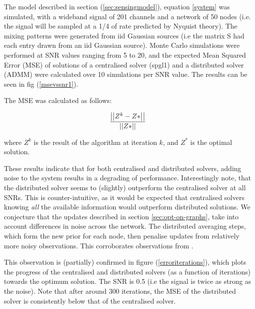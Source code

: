\documentclass[conference]{IEEEtran}
\begin{document}
The model described in section (\ref{sec:sensingmodel}), equation \eqref{system} was simulated, with a wideband signal of 201 channels and a network of 50 nodes (i.e. the signal will be sampled at a 1/4 of rate predicted by Nyquist theory). The mixing patterns were generated from iid Gaussian sources (i.e the matrix S had each entry drawn from an iid Gaussian source). Monte Carlo simulations were performed at SNR values ranging from 5 to 20, and the expected Mean Squared Error (MSE) of solutions of a centralised solver (spgl1) and a distributed solver (ADMM) were calculated over 10 simulations per SNR value. The results can be seen in fig (\ref{msevssnr1}). 

The MSE was calculated as follows:

\begin{equation}
\frac{\left|\left|Z^k - Z*\right|\right|}{\left|\left|Z*\right|\right|}
\end{equation}

where \(Z^k\) is the result of the algorithm at iteration \(k\), and \(Z^*\) is the optimal solution.

These results indicate that for both centralised and distributed solvers, adding noise to the system results in a degrading of performance. Interestingly note, that the distributed solver seems to (slightly) outperform the centralised solver at all SNRs. This is counter-intuitive, as it would be expected that centralised solvers knowing \textit{all} the available information would outperform distributed solutions. We conjecture that the updates described in section \eqref{sec:opt-on-graphs}, take into account differences in noise across the network. The distributed averaging steps, which form the new prior for each node, then penalise updates from relatively more noisy observations. This corroborates observations from \cite{bazerque2008}.

This observation is (partially) confirmed in figure (\ref{erroriterations}), which plots the progress of the centralised and distributed solvers (as a function of iterations) towards the optimum solution. The SNR is 0.5 (i.e the signal is twice as strong as the noise). Note that after around 300 iterations, the MSE of the distributed solver is consistently below that of the centralised solver.
\end{document}

